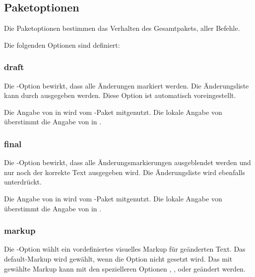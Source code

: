 \subsection{Paketoptionen}
\label{sec:ui:options}


Die Paketoptionen bestimmen das Verhalten des Gesamtpakets, \dh aller Befehle.

Die folgenden Optionen sind definiert:

\localtableofcontents



\subsubsection{draft}


Die -Option bewirkt, dass alle Änderungen markiert werden.
Die Änderungsliste kann durch  ausgegeben werden.
Diese Option ist automatisch voreingestellt.

Die Angabe von  in  wird vom -Paket mitgenutzt.
Die lokale Angabe von  überstimmt die Angabe von  in .

\subsubsection{final}


Die -Option bewirkt, dass alle Änderungsmarkierungen ausgeblendet werden und nur noch der korrekte Text ausgegeben wird.
Die Änderungsliste wird ebenfalls unterdrückt.

Die Angabe von  in  wird vom -Paket mitgenutzt.
Die lokale Angabe von  überstimmt die Angabe von  in .

\subsubsection{markup}


Die -Option wählt ein vordefiniertes visuelles Markup für geänderten Text.
Das default-Markup wird gewählt, wenn die Option nicht gesetzt wird.
Das mit  gewählte Markup kann mit den spezielleren Optionen , ,  oder  geändert werden.

